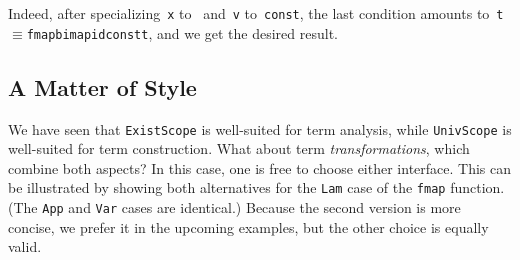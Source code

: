 \documentclass[9pt,preprint,authoryear]{sigplanconf}
\begin{document}
%
Indeed, after specializing{~}\textcolor[rgb]{0,0,0.80}{\texttt{x}} to{~}\textcolor[cmyk]{0,0.65,0.99,0}{\texttt{\makebox[1.22ex][l]{$ {(} $}}}\textcolor[cmyk]{0,0.65,0.99,0}{\texttt{\makebox[1.22ex][r]{$ {)} $}}} and{~}\textcolor[rgb]{0,0,0.80}{\texttt{v}}    to{~}\textcolor[rgb]{0,0,0.80}{\texttt{const}}\textcolor[rgb]{0,0,0.80}{\texttt{\mbox{\hspace{0.50em}}}}\textcolor[cmyk]{0,0.65,0.99,0}{\texttt{\makebox[1.22ex][l]{$ {(} $}}}\textcolor[cmyk]{0,0.65,0.99,0}{\texttt{\makebox[1.22ex][r]{$ {)} $}}}, the last condition amounts
    to{~}\textcolor[rgb]{0,0,0.80}{\texttt{t}}\textcolor[rgb]{0,0,0.80}{\texttt{\mbox{\hspace{0.50em}}}}\textcolor[cmyk]{0,0.65,0.99,0}{\texttt{$ \equiv $}}\textcolor[rgb]{0,0,0.80}{\texttt{\mbox{\hspace{0.50em}}}}\textcolor[rgb]{0,0,0.80}{\texttt{fmap}}\textcolor[rgb]{0,0,0.80}{\texttt{\mbox{\hspace{0.50em}}}}\textcolor[cmyk]{0,0.65,0.99,0}{\texttt{\makebox[1.22ex][l]{$ {(} $}}}\textcolor[rgb]{0,0,0.80}{\texttt{bimap}}\textcolor[rgb]{0,0,0.80}{\texttt{\mbox{\hspace{0.50em}}}}\textcolor[rgb]{0,0,0.80}{\texttt{id}}\textcolor[rgb]{0,0,0.80}{\texttt{\mbox{\hspace{0.50em}}}}\textcolor[cmyk]{0,0.65,0.99,0}{\texttt{\makebox[1.22ex][l]{$ {(} $}}}\textcolor[rgb]{0,0,0.80}{\texttt{const}}\textcolor[rgb]{0,0,0.80}{\texttt{\mbox{\hspace{0.50em}}}}\textcolor[cmyk]{0,0.65,0.99,0}{\texttt{\makebox[1.22ex][l]{$ {(} $}}}\textcolor[cmyk]{0,0.65,0.99,0}{\texttt{\makebox[1.22ex][r]{$ {)} $}}}\textcolor[cmyk]{0,0.65,0.99,0}{\texttt{\makebox[1.22ex][r]{$ {)} $}}}\textcolor[cmyk]{0,0.65,0.99,0}{\texttt{\makebox[1.22ex][r]{$ {)} $}}}\textcolor[rgb]{0,0,0.80}{\texttt{\mbox{\hspace{0.50em}}}}\textcolor[rgb]{0,0,0.80}{\texttt{t}}, and we get the desired
    result.%


\subsection{A Matter of Style\label{styleSec}}

%
We have seen that \textcolor[rgb]{0,0,0.80}{\texttt{ExistScope}} is well-suited for term analysis, while 
  \textcolor[rgb]{0,0,0.80}{\texttt{UnivScope}} is well-suited for term construction. What about term \emph{transformations},
  which combine both aspects? In this case, one is free to choose either interface. This 
  can be illustrated by showing both alternatives for the \textcolor[rgb]{0.70,0.13,0.13}{\texttt{Lam}} case of the \textcolor[rgb]{0,0,0.80}{\texttt{fmap}} function.
  (The \textcolor[rgb]{0.70,0.13,0.13}{\texttt{App}} and \textcolor[rgb]{0.70,0.13,0.13}{\texttt{Var}} cases are identical.) Because the second version is more concise, we prefer it
    in the upcoming examples, but the other choice is equally valid.%
\end{document}
